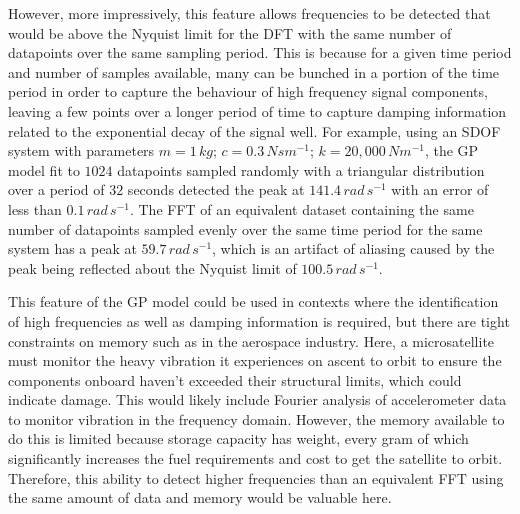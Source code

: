 \documentclass[12pt]{article}
\begin{document}
    However, more impressively, this feature allows frequencies to be detected that would be above the Nyquist limit for the DFT with the same number of datapoints over the same sampling period.
    This is because for a given time period and number of samples available, many can be bunched in a portion of the time period in order to capture the behaviour of high frequency signal components, leaving a few points over a longer period of time to capture damping information related to the exponential decay of the signal well.
    For example, using an SDOF system with parameters $m = 1 \, kg$; $c = 0.3 \, Nsm^{-1}$; $k = 20,000 \, Nm^{-1}$, the GP model fit to $1024$ datapoints sampled randomly with a triangular distribution over a period of $32$ seconds detected the peak at $141.4 \, rad \, s^{-1}$ with an error of less than $0.1 \, rad \, s^{-1}$.
    The FFT of an equivalent dataset containing the same number of datapoints sampled evenly over the same time period for the same system has a peak at $59.7 \, rad \, s^{-1}$, which is an artifact of aliasing caused by the peak being reflected about the Nyquist limit of $100.5 \, rad \, s^{-1}$.

    This feature of the GP model could be used in contexts where the identification of high frequencies as well as damping information is required, but there are tight constraints on memory such as in the aerospace industry.
    Here, a microsatellite must monitor the heavy vibration it experiences on ascent to orbit to ensure the components onboard haven't exceeded their structural limits, which could indicate damage.
    This would likely include Fourier analysis of accelerometer data to monitor vibration in the frequency domain.
    However, the memory available to do this is limited because storage capacity has weight, every gram of which significantly increases the fuel requirements and cost to get the satellite to orbit.
    Therefore, this ability to detect higher frequencies than an equivalent FFT using the same amount of data and memory would be valuable here.
\end{document}

